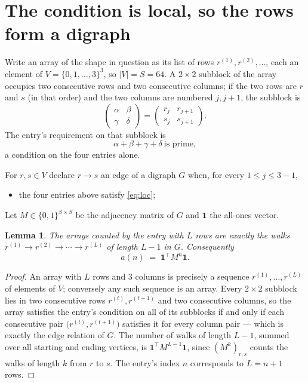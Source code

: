 \documentclass[11pt,a4paper]{article}
\theoremstyle{plain}
\newtheorem{lemma}[theorem]{Lemma}
\theoremstyle{definition}
\begin{document}
\section{The condition is local, so the rows form a digraph}

Write an array of the shape in question as its list of rows
$r^{(1)},r^{(2)},\dots$, each an element of
$V=\{0,1,\dots,3\}^{3}$, so $|V|=S=64$. A $2\times2$ subblock of the array
occupies two consecutive rows and two consecutive columns; if the two rows are $r$
and $s$ (in that order) and the two columns are numbered $j,j+1$,
the subblock is
\[
\begin{pmatrix}\alpha&\beta\\\gamma&\delta\end{pmatrix}=\begin{pmatrix}r_j&r_{j+1}\\s_j&s_{j+1}\end{pmatrix}.
\]
The entry's requirement on that subblock is
\begin{equation}\label{eq:loc}
\alpha+\beta+\gamma+\delta\ \text{is prime},
\end{equation}
a condition on the four entries alone.

For $r,s\in V$ declare $r\to s$ an edge of a digraph $G$ when, for every
$1\le j\le 3-1$,
\begin{itemize}
\item the four entries above satisfy \eqref{eq:loc};

\end{itemize}
Let $M\in\{0,1\}^{S\times S}$ be the adjacency matrix of $G$ and $\mathbf{1}$ the
all-ones vector.

\begin{lemma}\label{lem:walk}
The arrays counted by the entry with $L$ rows are exactly the walks
$r^{(1)}\to r^{(2)}\to\cdots\to r^{(L)}$ of length $L-1$ in $G$. Consequently
\[
a(n)\;=\;\mathbf{1}^{\!\top}M^{n}\mathbf{1} .
\]
\end{lemma}

\begin{proof}
An array with $L$ rows and $3$ columns is precisely a sequence
$r^{(1)},\dots,r^{(L)}$ of elements of $V$; conversely any such sequence is an array.
Every $2\times2$ subblock lies in two consecutive rows $r^{(t)},r^{(t+1)}$ and two
consecutive columns, so the array satisfies the entry's condition on all of its subblocks
if and only if each consecutive pair $\bigl(r^{(t)},r^{(t+1)}\bigr)$ satisfies it for
every column pair --- which is exactly the edge relation of $G$. The number of walks of
length $L-1$, summed over all starting and ending vertices, is
$\mathbf{1}^{\!\top}M^{L-1}\mathbf{1}$, since $(M^{k})_{r,s}$ counts the walks of
length $k$ from $r$ to $s$. The entry's index $n$ corresponds to $L=n+1$ rows.
\end{proof}
\end{document}
